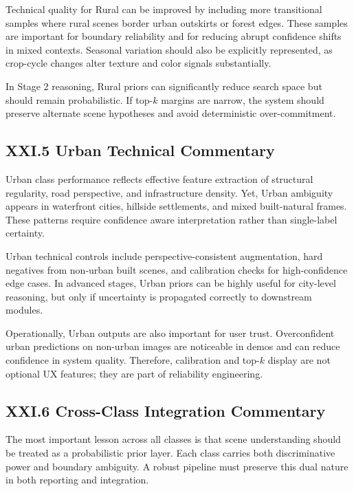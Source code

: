 Technical quality for Rural can be improved by including more transitional samples where rural scenes border urban outskirts or forest edges. These samples are important for boundary reliability and for reducing abrupt confidence shifts in mixed contexts. Seasonal variation should also be explicitly represented, as crop-cycle changes alter texture and color signals substantially.

In Stage 2 reasoning, Rural priors can significantly reduce search space but should remain probabilistic. If top-$k$ margins are narrow, the system should preserve alternate scene hypotheses and avoid deterministic over-commitment.

\subsection*{XXI.5 Urban Technical Commentary}
Urban class performance reflects effective feature extraction of structural regularity, road perspective, and infrastructure density. Yet, Urban ambiguity appears in waterfront cities, hillside settlements, and mixed built-natural frames. These patterns require confidence aware interpretation rather than single-label certainty.

Urban technical controls include perspective-consistent augmentation, hard negatives from non-urban built scenes, and calibration checks for high-confidence edge cases. In advanced stages, Urban priors can be highly useful for city-level reasoning, but only if uncertainty is propagated correctly to downstream modules.

Operationally, Urban outputs are also important for user trust. Overconfident urban predictions on non-urban images are noticeable in demos and can reduce confidence in system quality. Therefore, calibration and top-$k$ display are not optional UX features; they are part of reliability engineering.

\subsection*{XXI.6 Cross-Class Integration Commentary}
The most important lesson across all classes is that scene understanding should be treated as a probabilistic prior layer. Each class carries both discriminative power and boundary ambiguity. A robust pipeline must preserve this dual nature in both reporting and integration.

